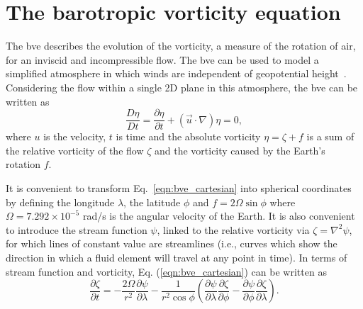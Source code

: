\documentclass[aps,pra,a4paper,twocolumn,longbibliography,groupedaddress]{revtex4-2}
\begin{document}
\section{The barotropic vorticity equation}\label{sec:bve}

The \gls{bve} describes the evolution of the vorticity, a measure of the rotation of air, for an inviscid and incompressible flow. The \gls{bve} can be used to model a simplified atmosphere in which winds are independent of geopotential height~\cite{shin2006critical, shaman2011atmospheric, tang2018nonlinear}. Considering the flow within a single 2D plane in this atmosphere, the \gls{bve} can be written as
\begin{equation}
    \frac{D\eta}{Dt} = \frac{\partial \eta}{\partial t} + (\vec{u} \cdot \nabla)\eta = 0,
    \label{eqn:bve_cartesian}
\end{equation}
where ${u}$ is the velocity, $t$ is time and the absolute vorticity $\eta = \zeta + f$ is a sum of the relative vorticity of the flow $\zeta$ and the vorticity caused by the Earth's rotation $f$.

It is convenient to transform Eq.~\eqref{eqn:bve_cartesian} into spherical coordinates by defining the longitude $\lambda$, the latitude $\phi$ and $f=2 \Omega \sin{\phi}$ where $\Omega = 7.292 \times 10^{-5}$ rad/s is the angular velocity of the Earth. It is also convenient to introduce the stream function $\psi$, linked to the relative vorticity via  $\zeta = \nabla^2 \psi$, for which lines of constant value are streamlines (i.e., curves which show the direction in which a fluid element will travel at any point in time). In terms of stream function and vorticity, Eq. (\ref{eqn:bve_cartesian}) can be written as
\begin{equation}
    \frac{\partial \zeta}{\partial t} = -\frac{2\Omega}{r^2}\frac{\partial \psi}{\partial \lambda} -  \frac{1}{r^2 \cos\phi}\left(\frac{\partial \psi}{\partial \lambda}\frac{\partial \zeta}{\partial \phi} - \frac{\partial \psi}{\partial \phi}\frac{\partial \zeta}{\partial \lambda} \right).
    \label{eqn:bve_spherical}
\end{equation}
\end{document}
